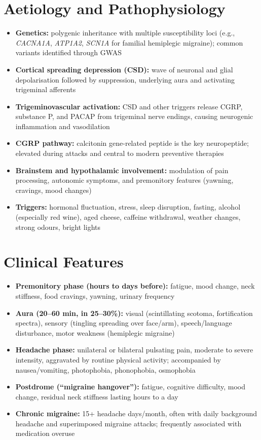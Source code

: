 \section*{Aetiology and Pathophysiology}
\begin{itemize}
    \item \textbf{Genetics:} polygenic inheritance with multiple susceptibility loci (e.g., \textit{CACNA1A}, \textit{ATP1A2}, \textit{SCN1A} for familial hemiplegic migraine); common variants identified through GWAS
    \item \textbf{Cortical spreading depression (CSD):} wave of neuronal and glial depolarisation followed by suppression, underlying aura and activating trigeminal afferents
    \item \textbf{Trigeminovascular activation:} CSD and other triggers release CGRP, substance P, and PACAP from trigeminal nerve endings, causing neurogenic inflammation and vasodilation
    \item \textbf{CGRP pathway:} calcitonin gene-related peptide is the key neuropeptide; elevated during attacks and central to modern preventive therapies
    \item \textbf{Brainstem and hypothalamic involvement:} modulation of pain processing, autonomic symptoms, and premonitory features (yawning, cravings, mood changes)
    \item \textbf{Triggers:} hormonal fluctuation, stress, sleep disruption, fasting, alcohol (especially red wine), aged cheese, caffeine withdrawal, weather changes, strong odours, bright lights
\end{itemize}

\section*{Clinical Features}
\begin{itemize}
    \item \textbf{Premonitory phase (hours to days before):} fatigue, mood change, neck stiffness, food cravings, yawning, urinary frequency
    \item \textbf{Aura (20--60 min, in 25--30\%):} visual (scintillating scotoma, fortification spectra), sensory (tingling spreading over face/arm), speech/language disturbance, motor weakness (hemiplegic migraine)
    \item \textbf{Headache phase:} unilateral or bilateral pulsating pain, moderate to severe intensity, aggravated by routine physical activity; accompanied by nausea/vomiting, photophobia, phonophobia, osmophobia
    \item \textbf{Postdrome (``migraine hangover''):} fatigue, cognitive difficulty, mood change, residual neck stiffness lasting hours to a day
    \item \textbf{Chronic migraine:} 15+ headache days/month, often with daily background headache and superimposed migraine attacks; frequently associated with medication overuse
\end{itemize}

